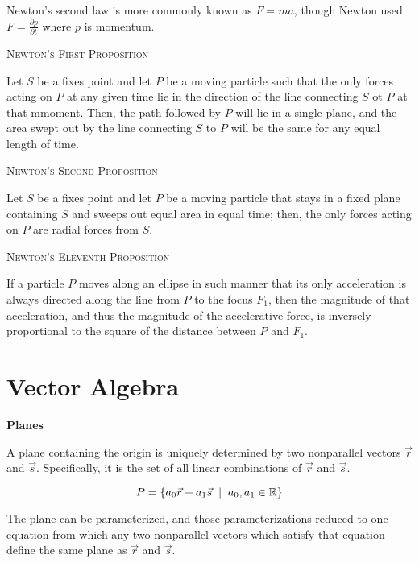 \documentclass{article}
\begin{document}
Newton's second law is more commonly known as $F = ma$, though Newton used $F = \frac{\partial{p}}{\partial{t}}$ where $p$ is momentum.

\bigskip

\textsc{Newton's First Proposition}

Let $S$ be a fixes point and let $P$ be a moving particle such that the only forces acting on $P$ at any given time lie in the direction of the line connecting $S$ ot $P$ at that mmoment.  Then, the path followed by $P$ will lie in a single plane, and the area swept out by the line connecting $S$ to $P$ will be the same for any equal length of time.

\bigskip

\textsc{Newton's Second Proposition}

Let $S$ be a fixes point and let $P$ be a moving particle that stays in a fixed plane containing $S$ and sweeps out equal area in equal time; then, the only forces acting on $P$ are radial forces from $S$.

\bigskip

\textsc{Newton's Eleventh Proposition}

If a particle $P$ moves along an ellipse in such manner that its only acceleration is always directed along the line from $P$ to the focus $F_1$, then the magnitude of that acceleration, and thus the magnitude of the accelerative force, is inversely proportional to the square of the distance between $P$ and $F_1$.

\section{Vector Algebra}

\bigskip

\textbf{Planes}

A plane containing the origin is uniquely determined by two nonparallel vectors $\vec{r}$ and $\vec{s}$.  Specifically, it is the set of all linear combinations of $\vec{r}$ and $\vec{s}$.

\[
P = \{ a_0 \vec{r} + a_1 \vec{s} \hspace{2mm} | \hspace{2mm} a_0, a_1 \in \mathbb{R} \}
\]

The plane can be parameterized, and those parameterizations reduced to one equation from which any two nonparallel vectors which satisfy that equation define the same plane as $\vec{r}$ and $\vec{s}$.

\bigskip
\end{document}
